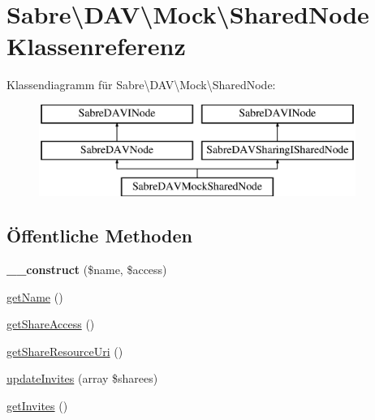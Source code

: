 \hypertarget{class_sabre_1_1_d_a_v_1_1_mock_1_1_shared_node}{}\section{Sabre\textbackslash{}D\+AV\textbackslash{}Mock\textbackslash{}Shared\+Node Klassenreferenz}
\label{class_sabre_1_1_d_a_v_1_1_mock_1_1_shared_node}
Klassendiagramm für Sabre\textbackslash{}D\+AV\textbackslash{}Mock\textbackslash{}Shared\+Node\+:\begin{figure}[H]
\begin{center}
\leavevmode
\includegraphics[height=3.000000cm]{class_sabre_1_1_d_a_v_1_1_mock_1_1_shared_node}
\end{center}
\end{figure}
\subsection*{Öffentliche Methoden}
\begin{DoxyCompactItemize}
\item 
\mbox{\label{class_sabre_1_1_d_a_v_1_1_mock_1_1_shared_node_a4c3d4428d078adc3387c9c79c9027751}} 
{\bfseries \+\_\+\+\_\+construct} (\$name, \$access)
\item 
\mbox{\hyperlink{class_sabre_1_1_d_a_v_1_1_mock_1_1_shared_node_ab4c6b66df500d3d781025ad0c16fa928}{get\+Name}} ()
\item 
\mbox{\hyperlink{class_sabre_1_1_d_a_v_1_1_mock_1_1_shared_node_a1b17b0c416f56f137a232a60ed8db525}{get\+Share\+Access}} ()
\item 
\mbox{\hyperlink{class_sabre_1_1_d_a_v_1_1_mock_1_1_shared_node_a428e362da7ce65a09585099b1b61065f}{get\+Share\+Resource\+Uri}} ()
\item 
\mbox{\hyperlink{class_sabre_1_1_d_a_v_1_1_mock_1_1_shared_node_a4dfbf2b033295cd266b532d7fcaed18c}{update\+Invites}} (array \$sharees)
\item 
\mbox{\hyperlink{class_sabre_1_1_d_a_v_1_1_mock_1_1_shared_node_a6deaecb18be485adbdc98b0132b4ab1e}{get\+Invites}} ()
\end{DoxyCompactItemize}
